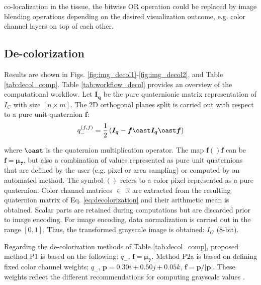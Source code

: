 \documentclass[superscriptaddress,longbibliography,aps,prl,twocolumn,10pt]{revtex4-2}
\begin{document}
co-localization in the tissue, the bitwise OR operation could be replaced by image blending operations depending on the desired visualization outcome, e.g. color channel layers on top of each other.

\subsection*{\normalsize{De-colorization}}
Results are shown in Figs. \ref{fig:img_decol1}-\ref{fig:img_decol2}, and Table \ref{tab:decol_comp}. Table \ref{tab:workflow_decol} provides an overview of the computational workflow. Let $\boldsymbol{I_{q}}$ be the pure quaternionic matrix representation of $I_C$ with size $[n \times m]$. The 2D orthogonal planes split is carried out with respect to a pure unit quaternion $\boldsymbol{f}$:
    \begin{equation} \label{eq:decolorization}
        q_{-}^{\left(f,f\right)} = \frac{1}{2} \left(\boldsymbol{I_{q}} - \boldsymbol{f} \oast \boldsymbol{I_{q}} \oast \boldsymbol{f} \right)
    \end{equation}

\noindent
where $\oast$ is the quaternion multiplication operator. The map $\boldsymbol{f}()\boldsymbol{f}$ can be $\boldsymbol{f} = \boldsymbol{\mu_{7}}$, but also a combination of values represented as pure unit quaternions that are defined by the user (e.g. pixel or area sampling) or computed by an automated method. The symbol $()$ refers to a color pixel represented as a pure quaternion. Color channel matrices $\in$ $\mathbb{R}$ are extracted from the resulting quaternion matrix of Eq. \ref{eq:decolorization} and their arithmetic mean is obtained. Scalar parts are retained during computations but are discarded prior to image encoding. For image encoding, data normalization is carried out in the range $[0,1]$. Thus, the transformed grayscale image is obtained: $I_{G}$ (8-bit).

Regarding the de-colorization methods of Table \ref{tab:decol_comp}, proposed method P1 is based on the following: $q_-$, $\boldsymbol{f} = \boldsymbol{\mu_{7}}$. Method P2a is based on defining fixed color channel weights; $q_-$, $\boldsymbol{p} = 0.30i + 0.50j + 0.05k$, $\boldsymbol{f} = \boldsymbol{p}/\left| \boldsymbol{p} \right |$. These weights reflect the different recommendations for computing grayscale values \cite{InternationalTelecommunicationUnion2011, ITU-R_BT709, ITU-R_BT.2100}.
\end{document}

